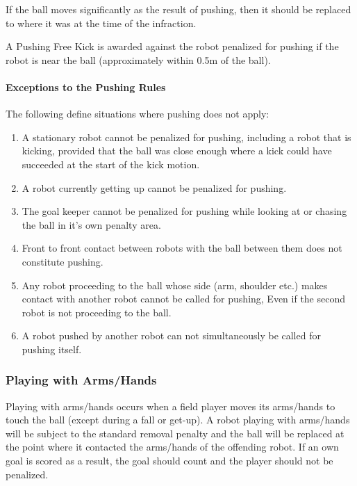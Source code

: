 
If the ball moves significantly as the result of pushing, then it should be replaced to where it was at the time of the infraction.

A Pushing Free Kick is awarded against the robot penalized for pushing if the robot is near the ball (approximately within 0.5m of the ball).

\paragraph{Exceptions to the Pushing Rules}
\label{sec:situations_no_pushing}

The following define situations where pushing does not apply:

\begin{enumerate}
  \item A stationary robot cannot be penalized for pushing, including a robot that is kicking, provided that the ball was close enough where a kick could have succeeded at the start of the kick motion.
  \item A robot currently getting up cannot be penalized for pushing.
  \item The goal keeper cannot be penalized for pushing while looking at or chasing the ball in it's own penalty area.
  \item Front to front contact between robots with the ball between them does not constitute pushing.
  \item Any robot proceeding to the ball whose side (\ie arm, shoulder etc.) makes contact with another robot cannot be called for pushing, Even if the second robot is not proceeding to the ball.
  \item A robot pushed by another robot can not simultaneously be called for pushing itself.
\end{enumerate}

\subsubsection{Playing with Arms/Hands}
\label{sec:hand_ball}

Playing with arms/hands occurs when a field player moves its arms/hands to touch the ball (except during a fall or get-up). A robot playing with arms/hands will be subject to the standard removal penalty and the ball will be replaced at the point where it contacted the arms/hands of the offending robot. If an own goal is scored as a result, the goal should count and the player should not be penalized.

